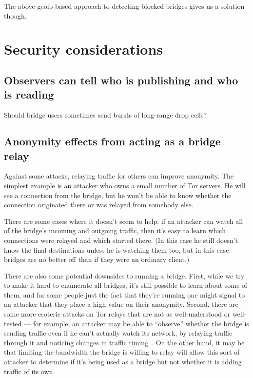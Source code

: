 \documentclass{llncs}
\begin{document}
The above geoip-based approach to detecting blocked bridges gives us a
solution though.


\section{Security considerations}
\label{sec:security}

\subsection{Observers can tell who is publishing and who is reading}
\label{subsec:upload-padding}

Should bridge users sometimes send bursts of long-range drop cells?

\subsection{Anonymity effects from acting as a bridge relay}

Against some attacks, relaying traffic for others can improve anonymity. The
simplest example is an attacker who owns a small number of Tor servers. He
will see a connection from the bridge, but he won't be able to know
whether the connection originated there or was relayed from somebody else.

There are some cases where it doesn't seem to help: if an attacker can
watch all of the bridge's incoming and outgoing traffic, then it's easy
to learn which connections were relayed and which started there. (In this
case he still doesn't know the final destinations unless he is watching
them too, but in this case bridges are no better off than if they were
an ordinary client.)

There are also some potential downsides to running a bridge. First, while
we try to make it hard to enumerate all bridges, it's still possible to
learn about some of them, and for some people just the fact that they're
running one might signal to an attacker that they place a high value
on their anonymity. Second, there are some more esoteric attacks on Tor
relays that are not as well-understood or well-tested --- for example, an
attacker may be able to ``observe'' whether the bridge is sending traffic
even if he can't actually watch its network, by relaying traffic through
it and noticing changes in traffic timing~\cite{attack-tor-oak05}. On
the other hand, it may be that limiting the bandwidth the bridge is
willing to relay will allow this sort of attacker to determine if it's
being used as a bridge but not whether it is adding traffic of its own.
\end{document}
